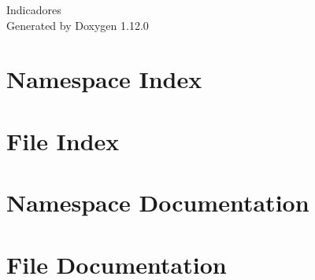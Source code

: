 \documentclass[twoside]{book}
\newcommand{\+}{\discretionary{\mbox{\scriptsize$\hookleftarrow$}}{}{}}
\newcommand{\clearemptydoublepage}{%
    \newpage{\pagestyle{empty}\cleardoublepage}%
  }
\begin{document}
  \raggedbottom
    \hypersetup{pageanchor=false,
                bookmarksnumbered=true,
                pdfencoding=unicode
               }
  \begin{titlepage}
  \vspace*{7cm}
  \begin{center}%
  {\Large Indicadores}\\
  \vspace*{1cm}
  {\large Generated by Doxygen 1.12.0}\\
  \end{center}
  \end{titlepage}
  \clearemptydoublepage
  \tableofcontents
  \clearemptydoublepage
  \hypersetup{pageanchor=true}
\chapter{Namespace Index}

\chapter{File Index}

\chapter{Namespace Documentation}






\chapter{File Documentation}




































  \backmatter
  \newpage
  \clearemptydoublepage
  \printindex
\end{document}
